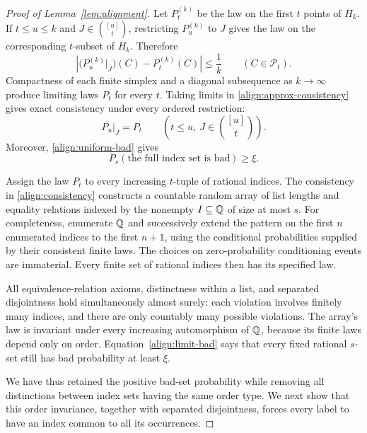 \begin{proof}[Proof of Lemma~\ref{lem:alignment}]
Let $P_t^{(k)}$ be the law on the first $t$ points of $H_k$.  If
$t\leq u\leq k$ and $J\in\binom{[u]}t$, restricting $P_u^{(k)}$ to
$J$ gives the law on the corresponding $t$-subset of $H_k$.  Therefore
\begin{equation}\label{align:approx-consistency}
 \left|
   \bigl(P_u^{(k)}|_J\bigr)(C)-P_t^{(k)}(C)
 \right|\leq\frac1k
 \qquad(C\in\mathcal P_t).
\end{equation}
Compactness of each finite simplex and a diagonal subsequence as
$k\to\infty$ produce limiting laws $P_t$ for every $t$.  Taking limits
in \eqref{align:approx-consistency} gives exact consistency under every
ordered restriction:
\begin{equation}\label{align:consistency}
 P_u|_J=P_t
 \qquad(t\leq u,\ J\in\binom{[u]}t).
\end{equation}
Moreover, \eqref{align:uniform-bad} gives
\begin{equation}\label{align:limit-bad}
 P_s(\text{the full index set is bad})\geq\xi.
\end{equation}

Assign the law $P_t$ to every increasing $t$-tuple of rational indices.
The consistency in \eqref{align:consistency} constructs a countable random
array of list lengths and equality relations indexed by the nonempty
$I\subseteq\mathbb Q$ of size at most $s$.  For completeness, enumerate $\mathbb Q$
and successively extend the pattern on the first $n$ enumerated indices
to the first $n+1$, using the conditional probabilities supplied by their
consistent finite laws.  The choices on zero-probability conditioning
events are immaterial.  Every finite set of rational indices then has its
specified law.

All equivalence-relation axioms, distinctness within a list, and separated
disjointness hold simultaneously almost surely: each violation involves
finitely many indices, and there are only countably many possible
violations.  The array's law is invariant under every increasing
automorphism of $\mathbb Q$, because its finite laws depend only on order.
Equation~\eqref{align:limit-bad} says that every fixed rational $s$-set
still has bad probability at least $\xi$.

We have thus retained the positive bad-set probability while removing all
distinctions between index sets having the same order type.  We next show
that this order invariance, together with separated disjointness, forces
every label to have an index common to all its occurrences.


\end{proof}
